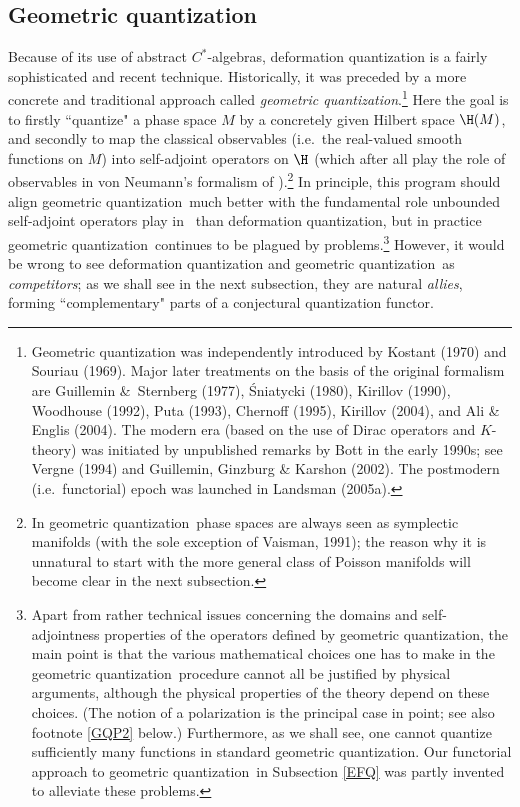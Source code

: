 \documentclass[12pt,titlepage]{article}
\newcommand{\ca}{$C^*$-algebra} \newcommand{\jba}{JB-algebra}
\newcommand{\gq}{geometric quantization}
\begin{document}
\subsection{Geometric quantization}\label{GQsection}
Because of its use of abstract \ca s, deformation quantization is a fairly sophisticated and recent technique.  Historically, it was preceded by a more concrete and traditional approach called {\it \gq}.\footnote{\label{GQrefs} Geometric quantization was independently introduced by  Kostant (1970) and Souriau (1969).  Major later treatments on the basis of the original formalism are  Guillemin  \&\ Sternberg (1977), \'{S}niatycki (1980),  Kirillov (1990),  Woodhouse (1992), Puta (1993), Chernoff (1995), Kirillov (2004), and Ali \& Englis (2004). The modern era (based on the use of Dirac operators and $K$-theory) was initiated  by unpublished remarks by Bott in the early 1990s; see Vergne (1994) and Guillemin, Ginzburg \&  Karshon (2002).
 The postmodern (i.e.\ functorial) epoch was launched  in Landsman (2005a).}
 Here the goal is to firstly ``quantize" a phase space $M$ by a concretely given Hilbert space $\H(M)$, and secondly to map the classical observables (i.e.\ the real-valued smooth functions on $M$) into self-adjoint operators on $\H$ (which after all play the role of observables in von Neumann's formalism of \qm).\footnote{In \gq\ phase spaces are always seen as symplectic manifolds (with the sole exception of Vaisman,  1991); the reason why it is unnatural to start with the more general class of Poisson manifolds will become clear in the next subsection.} In  principle, this program should align \gq\ much better with the fundamental role unbounded self-adjoint operators play in \qm\ than deformation quantization, but in practice \gq\ continues to be plagued by  problems.\footnote{\label{GQP1} Apart from rather technical issues concerning the domains and  self-adjointness properties of the operators defined by \gq, the main point is that the various mathematical choices one has to make in the \gq\ procedure
 cannot all be justified by physical arguments, although the physical properties of the theory depend on these choices. (The notion of a polarization is the principal case in point; see also footnote \ref{GQP2} below.) Furthermore, as we shall see, one cannot quantize sufficiently many functions in standard \gq. Our functorial approach to \gq\ in Subsection \ref{EFQ} was partly invented to alleviate these problems.}
  However, it would be wrong to see deformation quantization and \gq\ as {\it competitors}; as we shall see in the next subsection, they are natural {\it allies}, forming ``complementary" parts of a conjectural quantization functor. 
\end{document}

